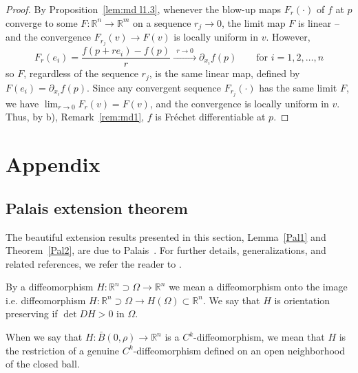\documentclass[12pt,leqno]{amsart}
\theoremstyle{definition}
\newcommand{\bbbr}{\mathbb R}
\numberwithin{theorem}{section} \numberwithin{equation}{section}
\begin{document}
\begin{proof}
By Proposition~\ref{lem:md l1.3}, whenever the blow-up maps $F_r(\cdot)$ of $f$ at $p$ converge to some $F:\bbbr^n\to\bbbr^m$ on a sequence $r_j\to 0$, the limit map $F$ is linear -- and the convergence $F_{r_j}(v)\to F(v)$ is locally uniform in $v$. However,
$$
F_r(e_i)=\frac{f(p+re_i)-f(p)}{r}\xrightarrow{~~r\to 0~~}\partial_{x_i}f(p) \qquad \text{for }i=1,2,\ldots,n
$$
so $F$, regardless of the sequence $r_j$, is the same linear map, defined by $F(e_i)=\partial_{x_i}f(p)$. Since any convergent sequence $F_{r_j}(\cdot)$ has the same limit $F$, we have $\lim_{r\to 0} F_r(v)=F(v)$, and the convergence is locally uniform in $v$. Thus, by b), Remark~\ref{rem:md1}, $f$ is Fr\'echet differentiable at $p$.
\end{proof}



\section{Appendix}
\label{APPE}


\subsection{Palais extension theorem}
\label{PET}
The beautiful extension results presented in this section, Lemma~\ref{Pal1} and Theorem~\ref{Pal2}, are due to Palais~\cite{palais}. For further details, generalizations, and related references, we refer the reader to \cite{GGH}.

By a diffeomorphism $H:\bbbr^n\supset\Omega\to\bbbr^n$ we mean a diffeomorphism onto the image i.e.
diffeomorphism $H:\bbbr^n\supset\Omega\to H(\Omega)\subset\bbbr^n$. We say that $H$ is orientation preserving if $\det DH>0$ in $\Omega$.

When we say that
$H:\bar{B}(0,\rho)\to \bbbr^n$
is a $C^k$-diffeomorphism, we mean that $H$ is the restriction of a genuine
$C^k$-diffeomorphism defined on an open neighborhood of the closed ball.
\end{document}
